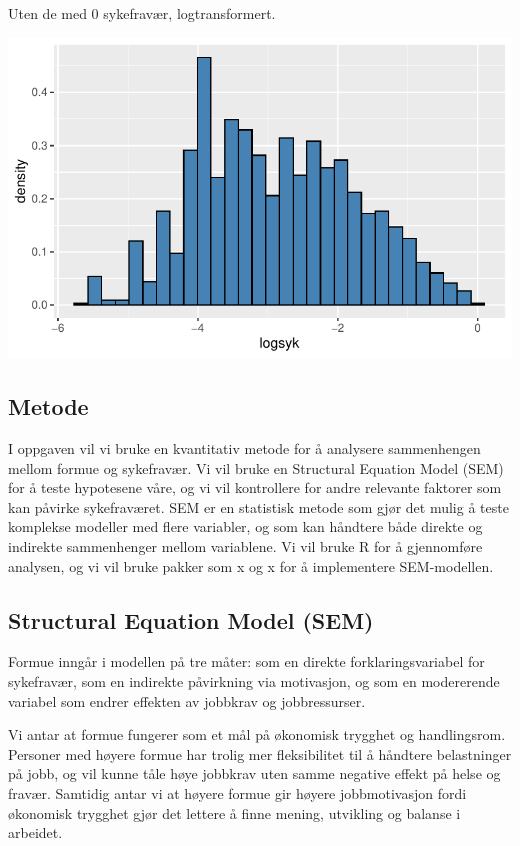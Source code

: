 \documentclass[
  12pt,
  a4paper,
  DIV=11,
  numbers=noendperiod]{scrartcl}
\begin{document}
Uten de med 0 sykefravær, logtransformert.

\includegraphics{kand_SOK2209_Bacheloroppgave_V25_files/figure-pdf/unnamed-chunk-18-1.pdf}

\subsection{Metode}\label{metode}

I oppgaven vil vi bruke en kvantitativ metode for å analysere
sammenhengen mellom formue og sykefravær. Vi vil bruke en Structural
Equation Model (SEM) for å teste hypotesene våre, og vi vil kontrollere
for andre relevante faktorer som kan påvirke sykefraværet. SEM er en
statistisk metode som gjør det mulig å teste komplekse modeller med
flere variabler, og som kan håndtere både direkte og indirekte
sammenhenger mellom variablene. Vi vil bruke R for å gjennomføre
analysen, og vi vil bruke pakker som x og x for å implementere
SEM-modellen.

\subsection{Structural Equation Model
(SEM)}\label{structural-equation-model-sem}

Formue inngår i modellen på tre måter: som en direkte
forklaringsvariabel for sykefravær, som en indirekte påvirkning via
motivasjon, og som en modererende variabel som endrer effekten av
jobbkrav og jobbressurser.

Vi antar at formue fungerer som et mål på økonomisk trygghet og
handlingsrom. Personer med høyere formue har trolig mer fleksibilitet
til å håndtere belastninger på jobb, og vil kunne tåle høye jobbkrav
uten samme negative effekt på helse og fravær. Samtidig antar vi at
høyere formue gir høyere jobbmotivasjon fordi økonomisk trygghet gjør
det lettere å finne mening, utvikling og balanse i arbeidet.
\end{document}

